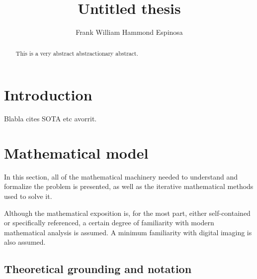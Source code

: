 \documentclass[twocolumn,twoside,a4paper,10pt]{IEEEtran}
\title{Untitled thesis}
\author{Frank William Hammond Espinosa}
\begin{document}

\maketitle



\begin{abstract}
\noindent This is a very abstract abstractionary abstract.
\end{abstract}

\section{Introduction}
Blabla cites SOTA etc avorrit.


\section{Mathematical model}

In this section, all of the mathematical machinery needed to understand and formalize the problem is presented, as well as the iterative mathematical methods used to solve it.

Although the mathematical exposition is, for the most part, either self-contained or specifically referenced, a certain degree of familiarity with modern mathematical analysis is assumed. A minimum familiarity with digital imaging is also assumed.
\subsection{Theoretical grounding and notation}\label{subsec:theoretical-grounding}
\end{document}
